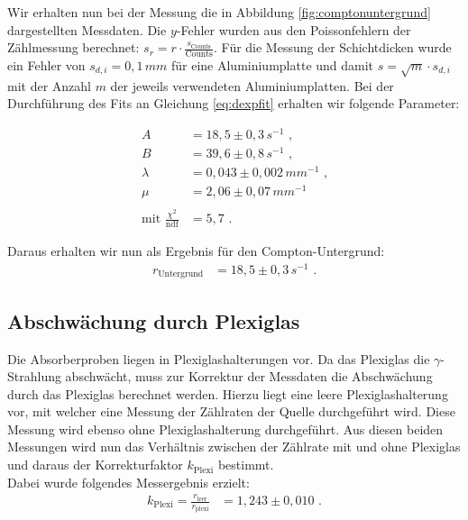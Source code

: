 Wir erhalten nun bei der Messung die in Abbildung \ref{fig:comptonuntergrund} dargestellten Messdaten. Die $y$-Fehler wurden aus den Poissonfehlern der Zählmessung berechnet: $s_r=r\cdot\frac{s_\text{Counts}}{\mathrm{Counts}}$. Für die Messung der Schichtdicken wurde ein Fehler von $s_{d,i}=0,1\,\si{mm}$ für eine Aluminiumplatte und damit $s=\sqrt{m}\cdot s_{d,i}$ mit der Anzahl $m$ der jeweils verwendeten Aluminiumplatten. Bei der Durchführung des Fits an Gleichung \ref{eq:dexpfit} erhalten wir folgende Parameter:

\begin{align*}
		A&=18,5\pm0,3\,\si{s^{-1}}\text{ ,}\\
		B&=39,6\pm0,8\,\si{s^{-1}}\text{ ,}\\
		\lambda&=0,043\pm0,002\,\si{mm^{-1}}\text{ ,}\\
		\mu&=2,06\pm0,07\,\si{mm^{-1}}\\
		\ \\
		\text{mit }\frac{\chi^2}{\mathrm{ndf}}&=5,7\text{ .}
\end{align*}

Daraus erhalten wir nun als Ergebnis für den Compton-Untergrund:
\begin{align}
	r_\text{Untergrund}&=18,5\pm0,3\,\si{s^{-1}}\text{ .}
\end{align}

\subsection{Abschwächung durch Plexiglas}

Die Absorberproben liegen in Plexiglashalterungen vor. Da das Plexiglas die $\gamma$-Strahlung abschwächt, muss zur Korrektur der Messdaten die Abschwächung durch das Plexiglas berechnet werden. Hierzu liegt eine leere Plexiglashalterung vor, mit welcher eine Messung der Zählraten der Quelle durchgeführt wird. Diese Messung wird ebenso ohne Plexiglashalterung durchgeführt. Aus diesen beiden Messungen wird nun das Verhältnis zwischen der Zählrate mit und ohne Plexiglas und daraus der Korrekturfaktor $k_\text{Plexi}$ bestimmt.\\

Dabei wurde folgendes Messergebnis erzielt:
\begin{align}
	k_\text{Plexi}=\frac{r_\text{leer}}{r_\text{plexi}}&=1,243\pm0,010\text{ .}
\end{align}

